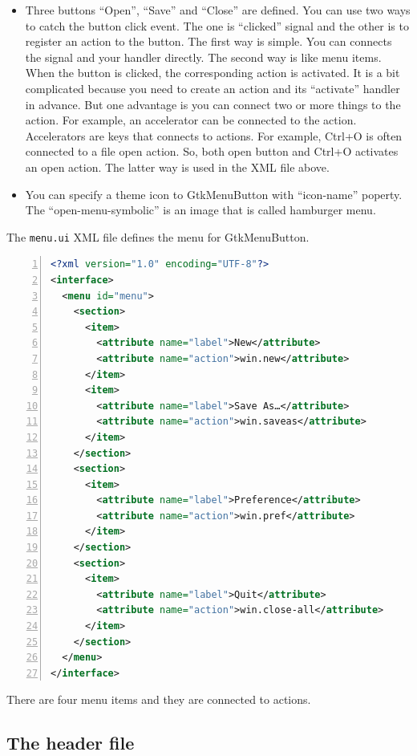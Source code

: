 \begin{itemize}
\tightlist
\item
  Three buttons ``Open'', ``Save'' and ``Close'' are defined. You can
  use two ways to catch the button click event. The one is ``clicked''
  signal and the other is to register an action to the button. The first
  way is simple. You can connects the signal and your handler directly.
  The second way is like menu items. When the button is clicked, the
  corresponding action is activated. It is a bit complicated because you
  need to create an action and its ``activate'' handler in advance. But
  one advantage is you can connect two or more things to the action. For
  example, an accelerator can be connected to the action. Accelerators
  are keys that connects to actions. For example, Ctrl+O is often
  connected to a file open action. So, both open button and Ctrl+O
  activates an open action. The latter way is used in the XML file
  above.
\item
  You can specify a theme icon to GtkMenuButton with ``icon-name''
  poperty. The ``open-menu-symbolic'' is an image that is called
  hamburger menu.
\end{itemize}

The \passthrough{\lstinline!menu.ui!} XML file defines the menu for
GtkMenuButton.

\begin{lstlisting}[language=XML, numbers=left]
<?xml version="1.0" encoding="UTF-8"?>
<interface>
  <menu id="menu">
    <section>
      <item>
        <attribute name="label">New</attribute>
        <attribute name="action">win.new</attribute>
      </item>
      <item>
        <attribute name="label">Save As…</attribute>
        <attribute name="action">win.saveas</attribute>
      </item>
    </section>
    <section>
      <item>
        <attribute name="label">Preference</attribute>
        <attribute name="action">win.pref</attribute>
      </item>
    </section>
    <section>
      <item>
        <attribute name="label">Quit</attribute>
        <attribute name="action">win.close-all</attribute>
      </item>
    </section>
  </menu>
</interface>
\end{lstlisting}

There are four menu items and they are connected to actions.

\subsection{The header file}\label{the-header-file}

